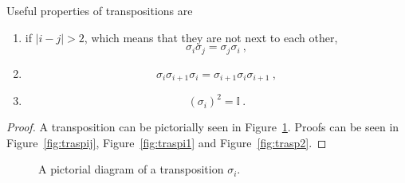     Useful properties of transpositions are
    \begin{enumerate}
        \item if $|i - j| > 2$, which means that they are not next to each other,
        \begin{equation}\label{perm:1}
            \sigma_i \sigma_j = \sigma_j \sigma_i ~,
        \end{equation} 
        \item \begin{equation}\label{perm:2}
            \sigma_i \sigma_{i+1} \sigma_i = \sigma_{i+1} \sigma_i \sigma_{i+1} ~,
        \end{equation}
        \item \begin{equation}\label{perm:3}
            (\sigma_i)^2 = \mathbb I ~.
        \end{equation}
    \end{enumerate}
    \begin{proof}
        A transposition can be pictorially seen in Figure~\ref{fig:trasp}. Proofs can be seen in Figure~\ref{fig:traspij}, Figure~\ref{fig:traspi1} and Figure~\ref{fig:trasp2}.
    \end{proof}

    \begin{figure}[h]
        \centering
        \caption{A pictorial diagram of a transposition $\sigma_i$.}
        \label{fig:trasp}
    \end{figure}
    
